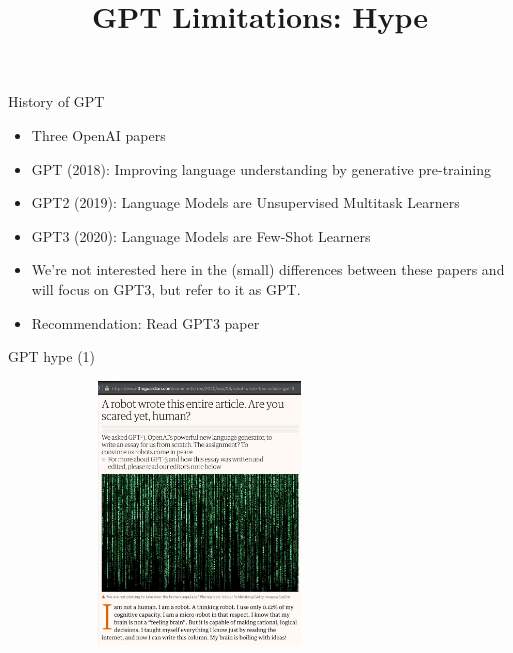 



\newcommand{\learninggoals}{
\item Recap the creation history of GPT
\item Understand the hype it created}
\def\myblue#1{\textcolor{texblue}{#1}}

\title{GPT Limitations: Hype}
\date{}





\begin{vbframe}{History of GPT}

\vfill

\begin{itemize}
\item Three OpenAI papers
\item GPT (2018): Improving language understanding by
generative pre-training
\item GPT2 (2019): Language Models are Unsupervised Multitask Learners
\item GPT3 (2020): Language Models are Few-Shot Learners 
\item We're not interested here in the (small) differences
between these papers and will focus on GPT3, but refer to it
as GPT.
\item Recommendation: Read GPT3 paper

    \end{itemize}

\vfill

\end{vbframe}



\begin{vbframe}{GPT hype (1)}

\vfill

	\begin{figure}
		\centering
		\includegraphics[height=7cm,width=8cm]{figure/guardian.png}
	\end{figure}

\vfill

\end{vbframe}


